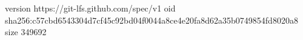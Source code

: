 version https://git-lfs.github.com/spec/v1
oid sha256:c57cbd6543304d7cf45c92bd04f0044a8ce4e20fa8d62a35b0749854fd8020a8
size 349692

